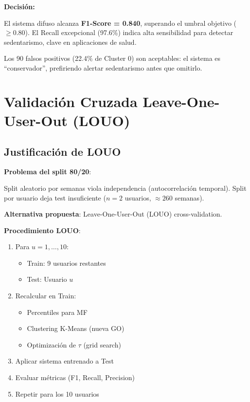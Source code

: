 \documentclass[12pt,letterpaper,twoside]{report}
\begin{document}
\begin{calculobox}
\begin{decisionbox}
\textbf{Decisión:}

El sistema difuso alcanza \textbf{F1-Score = 0.840}, superando el umbral objetivo ($\geq 0.80$). El Recall excepcional (97.6\%) indica alta sensibilidad para detectar sedentarismo, clave en aplicaciones de salud.

Los 90 falsos positivos (22.4\% de Cluster 0) son aceptables: el sistema es ``conservador'', prefiriendo alertar sedentarismo antes que omitirlo.
\end{decisionbox}

\section{Validación Cruzada Leave-One-User-Out (LOUO)}

\subsection{Justificación de LOUO}

\begin{hipotesisbox}
\textbf{Problema del split 80/20}:

Split aleatorio por semanas viola independencia (autocorrelación temporal). Split por usuario deja test insuficiente ($n=2$ usuarios, $\approx 260$ semanas).

\textbf{Alternativa propuesta}: Leave-One-User-Out (LOUO) cross-validation.
\end{hipotesisbox}

\begin{estadisticobox}
\textbf{Procedimiento LOUO}:

\begin{enumerate}[noitemsep]
    \item Para $u = 1, \ldots, 10$:
    \begin{itemize}[noitemsep]
        \item Train: 9 usuarios restantes
        \item Test: Usuario $u$
    \end{itemize}
    \item Recalcular en Train:
    \begin{itemize}[noitemsep]
        \item Percentiles para MF
        \item Clustering K-Means (nueva GO)
        \item Optimización de $\tau$ (grid search)
    \end{itemize}
    \item Aplicar sistema entrenado a Test
    \item Evaluar métricas (F1, Recall, Precision)
    \item Repetir para los 10 usuarios
\end{enumerate}


\end{estadisticobox}
\end{calculobox}
\end{document}
